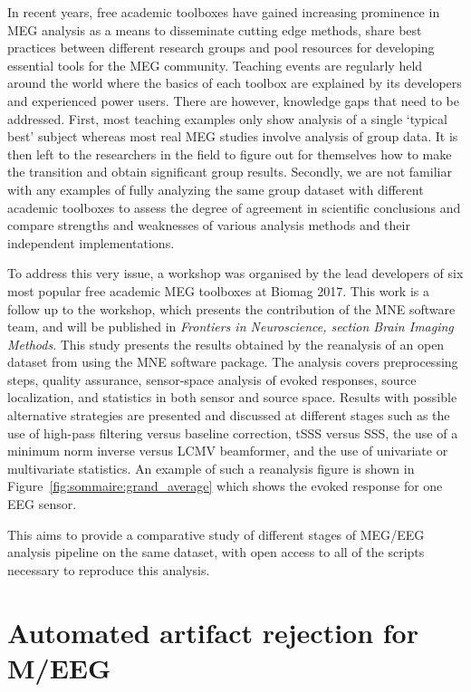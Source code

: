In recent years, free academic toolboxes have gained increasing prominence in \ac{MEG} analysis as a means to disseminate cutting edge methods, share best practices between different research groups and pool resources for developing essential tools for the \ac{MEG} community. Teaching events are regularly held around the world where the basics of each toolbox are explained by its  developers and experienced power users. There are however, knowledge gaps that need to be addressed. First, most teaching examples only show analysis of a single ‘typical best’ subject whereas most real MEG studies involve analysis of group data. It is then left to the researchers in the field to figure out for themselves how to make the transition and obtain significant group results. Secondly, we are not familiar with any examples of fully analyzing the same group dataset with different academic toolboxes to assess the degree of agreement in scientific conclusions and compare strengths and weaknesses of various analysis methods and their independent implementations.

To address this very issue, a workshop was organised by the lead developers of six most popular free academic MEG toolboxes at Biomag 2017. This work is a follow up to the workshop, which presents the contribution of the MNE software team, and will be published in \emph{Frontiers in Neuroscience, section Brain Imaging Methods}. This study presents the results obtained by the reanalysis of an open dataset from \citet{wakeman2015multi} using the MNE software package. The analysis covers preprocessing steps, quality assurance, sensor-space analysis of evoked responses, source localization, and statistics in both sensor and source space. Results with possible alternative strategies are presented and discussed at different stages such as the use of high-pass filtering versus baseline correction, tSSS versus \ac{SSS}, the use of a minimum norm inverse versus \ac{LCMV} beamformer, and the use of univariate or multivariate statistics. An example of such a reanalysis figure is shown in Figure~\ref{fig:sommaire:grand_average} which shows the evoked response for one EEG sensor.

This aims to provide a comparative study of different stages of \ac{MEG}/\ac{EEG} analysis pipeline on the same dataset, with open access to all of the scripts necessary to reproduce this analysis.

\clearpage

\section*{Automated artifact rejection for M/EEG}

